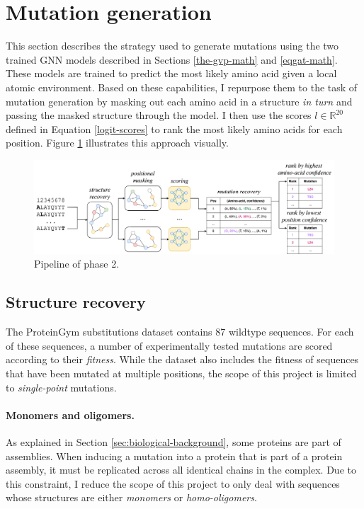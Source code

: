 \section{Mutation generation}
\label{sec:mutation-generation}
This section describes the strategy used to generate mutations using the two trained GNN models described in Sections \ref{the-gvp-math} and \ref{eqgat-math}. These models are trained to predict the most likely amino acid given a local atomic environment. Based on these capabilities, I repurpose them to the task of mutation generation by masking out each amino acid in a structure \textit{in turn} and passing the masked structure through the model. I then use the scores $l \in \mathbb{R}^{20}$ defined in Equation \ref{logit-scores} to rank the most likely amino acids for each position. Figure \ref{mutation-generation} illustrates this approach visually. 

\begin{figure}[!h]
    \centering
    \includegraphics[width=\textwidth]{masters-report/figures/mutation_generation_final.png}
    \caption{Pipeline of phase 2.}
    \label{mutation-generation}
\end{figure}


\subsection{Structure recovery}
\label{sec:structure-recovery}

The ProteinGym substitutions dataset \cite{tranception} contains 87 wildtype sequences. For each of these sequences, a number of experimentally tested mutations are scored according to their \textit{fitness}. While the dataset also includes the fitness of sequences that have been mutated at multiple positions, the scope of this project is limited to \textit{single-point} mutations. 

\paragraph{Monomers and oligomers.} 
As explained in Section \ref{sec:biological-background}, some proteins are part of assemblies. 
When inducing a mutation into a protein that is part of a protein assembly, it must be replicated across all identical chains in the complex. Due to this constraint, I reduce the scope of this project to only deal with sequences whose structures are either \textit{monomers} or \textit{homo-oligomers}. 

